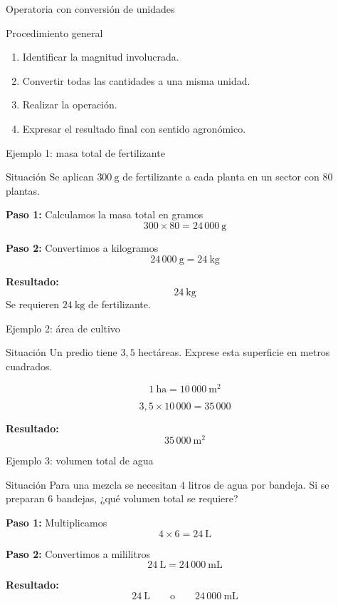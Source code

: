 \documentclass[aspectratio=169,10pt]{beamer}
\begin{document}
	\begin{frame}{Operatoria con conversión de unidades}
		\begin{block}{Procedimiento general}
			\begin{enumerate}[<+->]
				\item Identificar la magnitud involucrada.
				\item Convertir todas las cantidades a una misma unidad.
				\item Realizar la operación.
				\item Expresar el resultado final con sentido agronómico.
			\end{enumerate}
		\end{block}
	\end{frame}
	
	\begin{frame}{Ejemplo 1: masa total de fertilizante}
		\begin{block}{Situación}
			Se aplican \(300\ \text{g}\) de fertilizante a cada planta en un sector con \(80\) plantas.
		\end{block}
		
		\pause
		\textbf{Paso 1:} Calculamos la masa total en gramos
		\[
		300 \times 80 = 24\,000\ \text{g}
		\]
		
		\pause
		\textbf{Paso 2:} Convertimos a kilogramos
		\[
		24\,000\ \text{g} = 24\ \text{kg}
		\]
		
		\pause
		\textbf{Resultado:}
		\[
		\boxed{24\ \text{kg}}
		\]
		Se requieren \(24\ \text{kg}\) de fertilizante.
	\end{frame}
	
	\begin{frame}{Ejemplo 2: área de cultivo}
		\begin{block}{Situación}
			Un predio tiene \(3{,}5\) hectáreas. Exprese esta superficie en metros cuadrados.
		\end{block}
		
		\pause
		\[
		1\ \text{ha} = 10\,000\ \text{m}^2
		\]
		
		\pause
		\[
		3{,}5 \times 10\,000 = 35\,000
		\]
		
		\pause
		\textbf{Resultado:}
		\[
		\boxed{35\,000\ \text{m}^2}
		\]
	\end{frame}
	
	\begin{frame}{Ejemplo 3: volumen total de agua}
		\begin{block}{Situación}
			Para una mezcla se necesitan \(4\) litros de agua por bandeja.  
			Si se preparan \(6\) bandejas, ¿qué volumen total se requiere?
		\end{block}
		
		\pause
		\textbf{Paso 1:} Multiplicamos
		\[
		4 \times 6 = 24\ \text{L}
		\]
		
		\pause
		\textbf{Paso 2:} Convertimos a mililitros
		\[
		24\ \text{L} = 24\,000\ \text{mL}
		\]
		
		\pause
		\textbf{Resultado:}
		\[
		\boxed{24\ \text{L}} \qquad \text{o} \qquad \boxed{24\,000\ \text{mL}}
		\]
	\end{frame}
	
\end{document}
